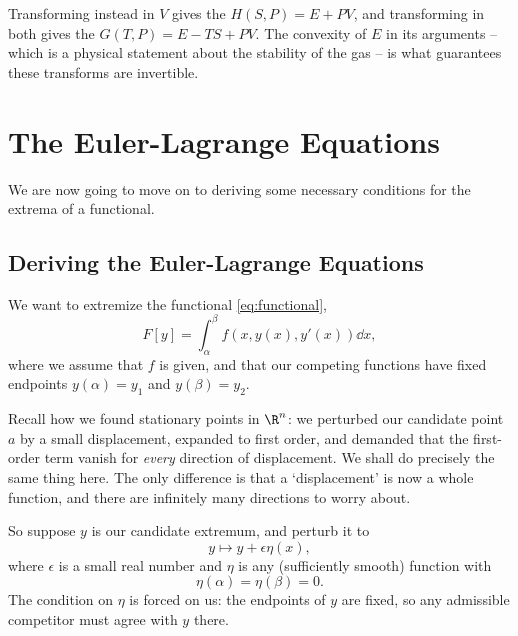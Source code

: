 Transforming instead in $V$ gives the  $H(S, P) = E + PV$, and transforming in both gives the  $G(T,P) = E - TS + PV$. The convexity of $E$ in its arguments -- which is a physical statement about the stability of the gas -- is what guarantees these transforms are invertible.

\section{The Euler-Lagrange Equations}

We are now going to move on to deriving some necessary conditions for the extrema of a functional.

\subsection{Deriving the Euler-Lagrange Equations}

We want to extremize the functional \eqref{eq:functional},
$$
	F[y] = \int_{\alpha}^{\beta} f(x, y(x), y'(x)) \dd x,
$$
where we assume that $f$ is given, and that our competing functions have fixed endpoints $y(\alpha) = y_1$ and $y(\beta) = y_2$.

Recall how we found stationary points in $\R^n$: we perturbed our candidate point $a$ by a small displacement, expanded to first order, and demanded that the first-order term vanish for \emph{every} direction of displacement. We shall do precisely the same thing here. The only difference is that a `displacement' is now a whole function, and there are infinitely many directions to worry about.

So suppose $y$ is our candidate extremum, and perturb it to
$$
y \mapsto y + \epsilon \eta(x),
$$
where $\epsilon$ is a small real number and $\eta$ is any (sufficiently smooth) function with
$$
\eta(\alpha) = \eta(\beta) = 0.
$$
The condition on $\eta$ is forced on us: the endpoints of $y$ are fixed, so any admissible competitor must agree with $y$ there.

